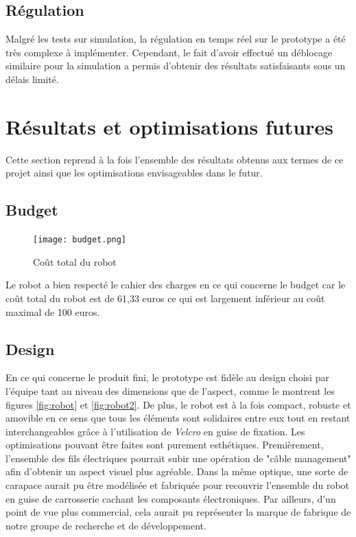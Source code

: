 \documentclass[a4paper,11pt]{article}
\begin{document}
\subsection{\label{subsec:reg4real}Régulation}

Malgré les tests sur simulation, la régulation en temps réel sur le prototype a été très complexe à implémenter. Cependant, le fait d'avoir effectué un déblocage similaire pour la simulation a permis d'obtenir des résultats satisfaisants sous un délais limité.
\clearpage

\section{Résultats et optimisations futures}
Cette section reprend à la fois l'ensemble des résultats obtenus aux termes de ce projet ainsi que les optimisations envisageables dans le futur.

\subsection{Budget}

\begin{figure}[H]
    \centering
    \texttt{[image: budget.png]}
    \caption{Coût total du robot}
    \label{fig:budget}
\end{figure}

Le robot a bien respecté le cahier des charges en ce qui concerne le budget car le coût total du robot est de 61,33 euros ce qui est largement inférieur au coût maximal de 100 euros. 

\subsection{Design}
En ce qui concerne le produit fini, le prototype est fidèle au design choisi par l'équipe tant au niveau des dimensions que de l'aspect, comme le montrent les figures \ref{fig:robot} et \ref{fig:robot2}. De plus, le robot est à la fois compact, robuste et amovible en ce sens que tous les éléments sont solidaires entre eux tout en restant interchangeables grâce à l'utilisation de \textit{Velcro} en guise de fixation. 
Les optimisations pouvant être faites sont purement esthétiques. Premièrement, l'ensemble des fils électriques pourrait subir une opération de "câble management" afin d'obtenir un aspect visuel plus agréable. Dans la même optique, une sorte de carapace aurait pu être modélisée et fabriquée pour recouvrir l'ensemble du robot en guise de carrosserie cachant les composants électroniques. Par ailleurs, d'un point de vue plus commercial, cela aurait pu représenter la marque de fabrique de notre groupe de recherche et de développement.
\end{document}
